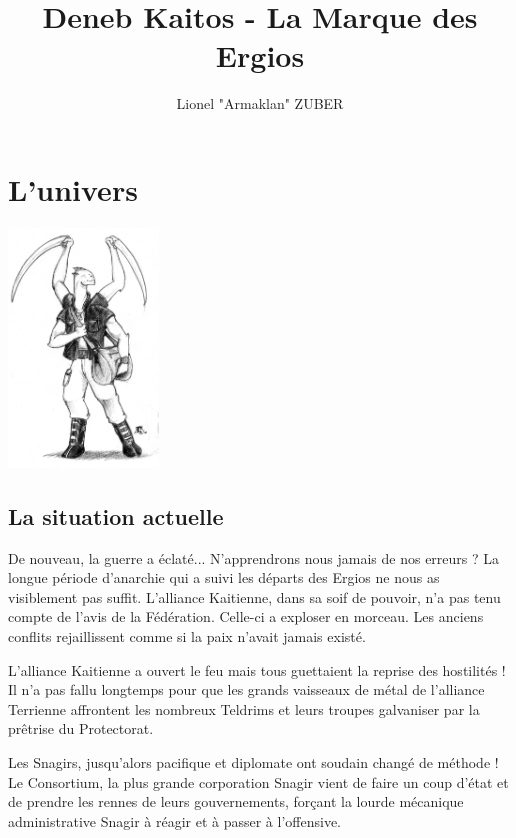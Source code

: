 \documentclass{DenebClass}
\title{Deneb Kaitos - La Marque des Ergios}
\author{Lionel "Armaklan" ZUBER}
\begin{document}
\maketitle
\clearpage

\chapter{L'univers}

\begin{multicols}{2}

\begin{center}
	\includegraphics[width=113pt]{../Img/velios}
\end{center}

\section{La situation actuelle}

De nouveau, la guerre a éclaté... N'apprendrons nous jamais de nos erreurs ? La longue période d'anarchie qui a suivi les départs des Ergios ne nous as visiblement pas suffit. L'alliance Kaitienne, dans sa soif de pouvoir, n'a pas tenu compte de l'avis de la Fédération. Celle-ci a exploser en morceau. Les anciens conflits rejaillissent comme si la paix n'avait jamais existé. 

L'alliance Kaitienne a ouvert le feu mais tous guettaient la reprise des hostilités ! Il n'a pas fallu longtemps pour que les grands vaisseaux de métal de l'alliance Terrienne affrontent les nombreux Teldrims et leurs troupes galvaniser par la prêtrise du Protectorat. 

Les Snagirs, jusqu'alors pacifique et diplomate ont soudain changé de méthode ! Le Consortium, la plus grande corporation Snagir vient de faire un coup d'état et de prendre les rennes de leurs gouvernements, forçant la lourde mécanique administrative Snagir à réagir et à passer à l'offensive. 


\end{multicols}
\end{document}
